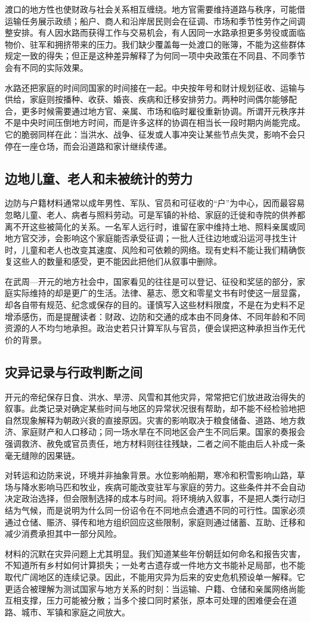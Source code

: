渡口的地方性也使财政与社会关系相互缠绕。地方官需要维持道路与秩序，可能借运输任务展示政绩；船户、商人和沿岸居民则会在征调、市场和季节性劳作之间调整安排。有人因水路而获得工作与交易机会，有人因同一水路承担更多劳役或面临物价、驻军和拥挤带来的压力。我们缺少覆盖每一处渡口的账簿，不能为这些群体规定一致的得失；但正是这种差异解释了为何同一项中央政策在不同县、不同季节会有不同的实际效果。

水路还把家庭的时间同国家的时间接在一起。中央按年号和财计规划征收、运输与供给，家庭则按播种、收获、婚丧、疾病和迁移安排劳力。两种时间偶尔能够配合，更多时候需要通过地方官、亲属、市场和临时雇役重新协调。所谓开元秩序并不是中央时间压倒地方时间，而是许多这样的协调在相当长一段时期内尚能完成。它的脆弱同样在此：当洪水、战争、征发或人事冲突让某些节点失灵，影响不会只停在一座仓场，而会沿道路和家计继续传递。

\subsection{边地儿童、老人和未被统计的劳力}
边防与户籍材料通常以成年男性、军队、官员和可征收的“户”为中心，因而最容易忽略儿童、老人、病者与照料劳动。可是军镇的补给、家庭的迁徙和寺院的供养都离不开这些被简化的关系。一名军人远行时，谁留在家中维持土地、照料亲属或同地方官交涉，会影响这个家庭能否承受征调；一批人迁往边地或沿运河寻找生计时，儿童和老人也改变其速度、风险和可依赖的网络。现有史料不能让我们精确恢复这些人的数量和感受，更不能因此把他们从叙事中删除。

在武周—开元的地方社会中，国家看见的往往是可以登记、征役和奖惩的部分，家庭实际维持的却是更广的生活。法律、墓志、愿文和零星文书有时使这一层显露，却各自带有规范、纪念或保存的目的。谨慎写入这些材料限度，不是在为史料不足增添感伤，而是提醒读者：财政、边防和交通的成本由不同身体、不同年龄和不同资源的人不均匀地承担。政治史若只计算军队与官员，便会误把这种承担当作无代价的背景。

\subsection{灾异记录与行政判断之间}
开元的帝纪保存日食、洪水、旱涝、风雪和其他灾异，常常把它们放进政治得失的叙事。此类记录对确定某些时间与地区的异常状况很有帮助，却不能不经检验地把自然现象解释为朝政兴衰的直接原因。灾害的影响取决于粮食储备、道路、地方救济、家庭财产和人口移动；同一场水旱在不同地区会产生不同后果。国家的奏报会强调救济、赦免或官员责任，地方材料则往往残缺，二者之间不能由后人补成一条毫无缝隙的因果链。

对转运和边防来说，环境并非抽象背景。水位影响船期，寒冷和积雪影响山路，草场与降水影响马匹和牧业，疾病可能改变驻军与家庭的劳力。这些条件并不会自动决定政治选择，但会限制选择的成本与时间。将环境纳入叙事，不是把人类行动归结为气候，而是说明为什么同一份诏令在不同地点会遭遇不同的可行性。国家必须通过仓储、赈济、驿传和地方组织回应这些限制，家庭则通过储蓄、互助、迁移和减少消费承担其中一部分风险。

材料的沉默在灾异问题上尤其明显。我们知道某些年份朝廷如何命名和报告灾害，不知道所有乡村如何计算损失；一处考古遗存或一件地方文书能补足局部，也不能取代广阔地区的连续记录。因此，不能用灾异为后来的安史危机预设单一解释。它更适合被理解为测试国家与地方关系的时刻：当运输、户籍、仓储和亲属网络尚能互相支撑，压力可能被分散；当多个接口同时紧张，原本可处理的困难便会在道路、城市、军镇和家庭之间放大。
